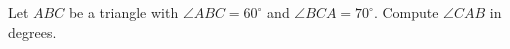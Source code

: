 Let $ABC$ be a triangle with $\angle ABC = 60^\circ$ and $\angle BCA = 70^\circ$. Compute $\angle CAB$ in degrees.
